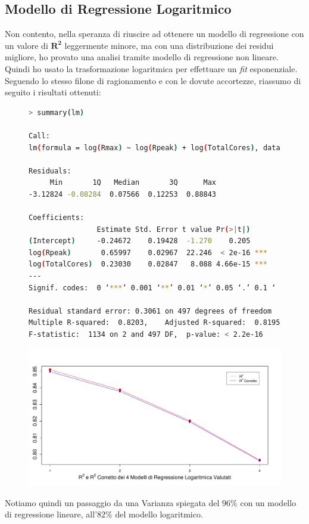 \documentclass[11pt,a4paper]{article}
\begin{document}
\subsection{Modello di Regressione Logaritmico}
Non contento, nella speranza di riuscire ad ottenere un modello di regressione
con un valore di $\boldsymbol{R^2}$ leggermente minore, ma con una distribuzione
dei residui migliore, ho provato una analisi tramite modello di regressione non
lineare. Quindi ho usato la trasformazione logaritmica per effettuare un
\textit{fit} esponenziale. Seguendo lo stesso filone di ragionamento e con le
dovute accortezze, riassumo di seguito i risultati ottenuti:
\clearpage
\begin{figure}[h]
	\vspace{-1.5cm}
	\hspace{-2.15cm}
	\begin{minipage}{.6\textwidth} 
		\begin{lstlisting}[language=bash,basicstyle=\tiny,tabsize=2,frame = single]
> summary(lm)

Call:
lm(formula = log(Rmax) ~ log(Rpeak) + log(TotalCores), data = data)

Residuals:
     Min       1Q   Median       3Q      Max 
-3.12824 -0.08284  0.07566  0.12253  0.88843 

Coefficients:
                Estimate Std. Error t value Pr(>|t|)    
(Intercept)     -0.24672    0.19428  -1.270    0.205    
log(Rpeak)       0.65997    0.02967  22.246  < 2e-16 ***
log(TotalCores)  0.23030    0.02847   8.088 4.66e-15 ***
---
Signif. codes:  0 ‘***’ 0.001 ‘**’ 0.01 ‘*’ 0.05 ‘.’ 0.1 ‘ ’ 1

Residual standard error: 0.3061 on 497 degrees of freedom
Multiple R-squared:  0.8203,	Adjusted R-squared:  0.8195 
F-statistic:  1134 on 2 and 497 DF,  p-value: < 2.2e-16
		\end{lstlisting}
	\end{minipage}
	\begin{minipage}{0.5\textwidth} 
		\includegraphics[scale=.36]{imgs/r_squared_log.pdf}
	\end{minipage}
\end{figure}
\vspace{-0.4cm}\noindent
Notiamo quindi un passaggio da una Varianza spiegata del $96\%$ con un modello
di regressione lineare, all'$82\%$ del modello logaritmico.
\end{document}
